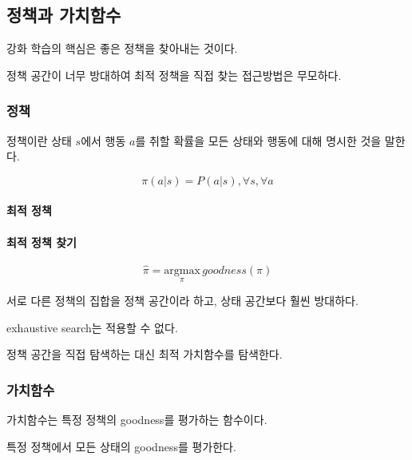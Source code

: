 \documentclass [12pt] {oblivoir}
\let\oldsubsubsection=\subsubsection
\renewcommand{\subsubsection}
{
  \filbreak
  \oldsubsubsection
}
\begin{document}
\vspace{3mm}

\subsection{정책과 가치함수}

강화 학습의 핵심은  좋은 정책을 찾아내는 것이다.

정책 공간이 너무 방대하여 최적 정책을 직접 찾는 접근방법은 무모하다.

\subsubsection{정책}

정책이란 상태 $s$에서 행동 $a$를 취할 확률을 모든 상태와 행동에 대해 명시한 것을 말한다.

\begin{equation} \tag{9.5}
  \pi(a \vert s) = P(a \vert s), \forall s, \forall a
\end{equation}

\paragraph*{최적 정책}\mbox{}

\vspace{3mm}

\paragraph*{최적 정책 찾기}\mbox{}

\begin{equation} \tag{9.7}
  \hat{\pi} = \underset{\pi}{\mathrm{argmax}}\,goodness(\pi)
\end{equation}

서로 다른 정책의 집합을 정책 공간이라 하고, 상태 공간보다 훨씬 방대하다.

exhaustive search는 적용할 수 없다.

정책 공간을 직접 탐색하는 대신 최적 가치함수를 탐색한다.

\vspace{3mm}

\subsubsection{가치함수}

가치함수는 특정 정책의 goodness를 평가하는 함수이다.

특정 정책에서 모든 상태의 goodness를 평가한다.
\end{document}
